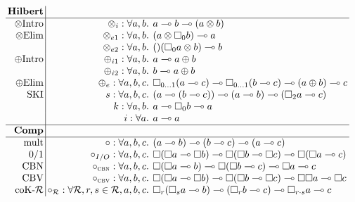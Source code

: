 {\small{
\begin{figure}
\begin{align*}
\hspace{-2em}
\setlength{\arraycolsep}{0.2em}
\begin{array}{r|rll}
\textbf{Hilbert} & \\ \hline
\text{$\otimes{}$Intro} & \otimes_i : \forall a , b . & a \multimap b \multimap (a \otimes b) \\
\text{$\otimes{}$Elim} & \otimes_{e1} : \forall a , b . & (a \otimes \Box_0 b) \multimap a \\
                       & \otimes_{e2} : \forall a , b . & () (\Box_0 a \otimes b) \multimap b \\
\text{$\oplus{}$Intro} & \oplus_{i1} : \forall a , b . & a \multimap a \oplus b \\
                       & \oplus_{i2} : \forall a , b . & b \multimap a \oplus b \\
\text{$\oplus{}$Elim}  & \oplus_{e} : \forall a , b, c . & \Box_{0...1}(a \multimap c) \multimap \Box_{0...1}(b \multimap c) \multimap (a \oplus b) \multimap c \\
\text{SKI} & s : \forall a, b, c . & (a \multimap (b \multimap c)) \multimap (a \multimap b) \multimap (\Box_2 a \multimap c) \\
& k : \forall a, b . & a \multimap \Box_0 b \multimap a \\
& i : \forall a . & a \multimap a \\ \hline
\textbf{Comp} & \\ \hline
\text{mult} & \circ : \forall a, b, c . & (a \multimap b) \multimap (b \multimap c) \multimap (a \multimap c) \\
\text{0/1} & \circ_{I/O} :\forall a, b, c . & \Box (\Box a \multimap \Box b) \multimap \Box (\Box b \multimap \Box c) \multimap \Box (\Box a \multimap c) \\
\text{CBN} & \circ_{\textsc{cbn}} : \forall a, b, c . & \Box (\Box a \multimap b) \multimap \Box (\Box b \multimap c) \multimap \Box a \multimap c \\
\text{CBV} & \circ_{\textsc{cbv}} : \forall a, b, c . & \Box (\Box a \multimap \Box b) \multimap \Box (\Box b \multimap \Box c) \multimap \Box \Box a \multimap \Box c\\
\text{coK-$\mathcal{R}$} & \circ_{\mathcal{R}} :
\forall \mathcal{R}, r, s \in \mathcal{R}, a, b, c . &
      \Box_r (\Box_s a \multimap b) \multimap (\Box_r b \multimap c) \multimap \Box_{r \cdot s} a \multimap c
\\

\end{array}
\end{align*}
\end{figure}}}
